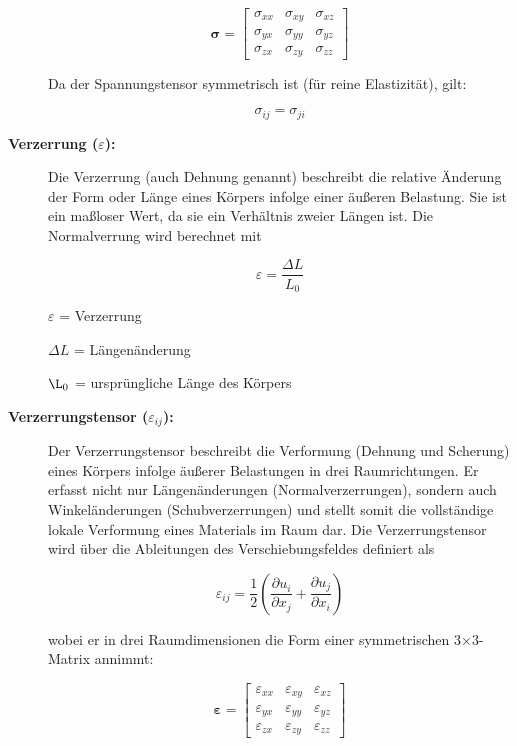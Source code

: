 \begin{description}
	\begin{equation}
	\boldsymbol{\sigma} =
	\begin{bmatrix}
		\sigma_{xx} & \sigma_{xy} & \sigma_{xz} \\
		\sigma_{yx} & \sigma_{yy} & \sigma_{yz} \\
		\sigma_{zx} & \sigma_{zy} & \sigma_{zz}
	\end{bmatrix}
	\end{equation}

	Da der Spannungstensor symmetrisch ist (für reine Elastizität), gilt:

	\begin{equation}
		\sigma_{ij} = 
		\sigma_{ji}
	\end{equation}
		
	\item[\textbf{Verzerrung ($\varepsilon$):}] Die Verzerrung (auch Dehnung genannt) beschreibt die relative Änderung der Form oder Länge eines Körpers infolge einer äußeren Belastung. 
	Sie ist ein maßloser Wert, da sie ein Verhältnis zweier Längen ist.
	Die Normalverrung wird berechnet mit

	\begin{equation}
		\varepsilon 
		= \frac{\Delta L}{L_0}
	\end{equation}

	$\varepsilon$ = Verzerrung
	
	$\Delta L$ = Längenänderung
	
	$\L_0$ = ursprüngliche Länge des Körpers
	
	\item[\textbf{Verzerrungstensor ($\varepsilon_{ij}$):}] Der Verzerrungstensor beschreibt die Verformung (Dehnung und Scherung) eines Körpers infolge äußerer Belastungen in drei Raumrichtungen. 
	Er erfasst nicht nur Längenänderungen (Normalverzerrungen), sondern auch Winkeländerungen (Schubverzerrungen) und stellt somit die vollständige lokale Verformung eines Materials im Raum dar.
	Die Verzerrungstensor wird über die Ableitungen des Verschiebungsfeldes definiert als

	\begin{equation}
		\varepsilon_{ij} = 
		\frac{1}{2} \left( \frac{\partial u_i}{\partial x_j} + \frac{\partial u_j}{\partial x_i} \right)
	\end{equation}

	wobei er in drei Raumdimensionen die Form einer symmetrischen 3×3-Matrix annimmt:

	\begin{equation}
	\boldsymbol{\varepsilon} =
	\begin{bmatrix}
		\varepsilon_{xx} & \varepsilon_{xy} & \varepsilon_{xz} \\
		\varepsilon_{yx} & \varepsilon_{yy} & \varepsilon_{yz} \\
		\varepsilon_{zx} & \varepsilon_{zy} & \varepsilon_{zz}
	\end{bmatrix}
	\end{equation}
		

\end{description}
